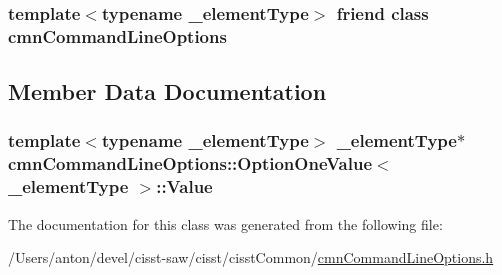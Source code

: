 \subsubsection[{cmn\+Command\+Line\+Options}]{\setlength{\rightskip}{0pt plus 5cm}template$<$typename \+\_\+element\+Type$>$ friend class {\bf cmn\+Command\+Line\+Options}\hspace{0.3cm}{\ttfamily [friend]}}\label{classcmn_command_line_options_1_1_option_one_value_a18923f23ed3914806f1edf878a64b422}


\subsection{Member Data Documentation}
\hypertarget{classcmn_command_line_options_1_1_option_one_value_a340ec92ab141ab98bc7469c78e970eb6}{}
\subsubsection[{Value}]{\setlength{\rightskip}{0pt plus 5cm}template$<$typename \+\_\+element\+Type$>$ \+\_\+element\+Type$\ast$ {\bf cmn\+Command\+Line\+Options\+::\+Option\+One\+Value}$<$ \+\_\+element\+Type $>$\+::Value\hspace{0.3cm}{\ttfamily [protected]}}\label{classcmn_command_line_options_1_1_option_one_value_a340ec92ab141ab98bc7469c78e970eb6}


The documentation for this class was generated from the following file\+:\begin{DoxyCompactItemize}
\item 
/\+Users/anton/devel/cisst-\/saw/cisst/cisst\+Common/\hyperlink{cmn_command_line_options_8h}{cmn\+Command\+Line\+Options.\+h}\end{DoxyCompactItemize}
